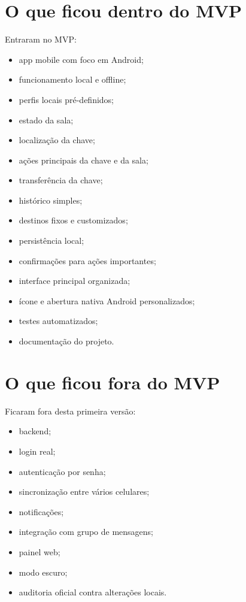 \documentclass[12pt,a4paper]{article}
\begin{document}
\clearpage

\section{O que ficou dentro do MVP}

Entraram no MVP:

\begin{itemize}
    \item app mobile com foco em Android;
    \item funcionamento local e offline;
    \item perfis locais pré-definidos;
    \item estado da sala;
    \item localização da chave;
    \item ações principais da chave e da sala;
    \item transferência da chave;
    \item histórico simples;
    \item destinos fixos e customizados;
    \item persistência local;
    \item confirmações para ações importantes;
    \item interface principal organizada;
    \item ícone e abertura nativa Android personalizados;
    \item testes automatizados;
    \item documentação do projeto.
\end{itemize}

\section{O que ficou fora do MVP}

Ficaram fora desta primeira versão:

\begin{itemize}
    \item backend;
    \item login real;
    \item autenticação por senha;
    \item sincronização entre vários celulares;
    \item notificações;
    \item integração com grupo de mensagens;
    \item painel web;
    \item modo escuro;
    \item auditoria oficial contra alterações locais.
\end{itemize}
\end{document}
